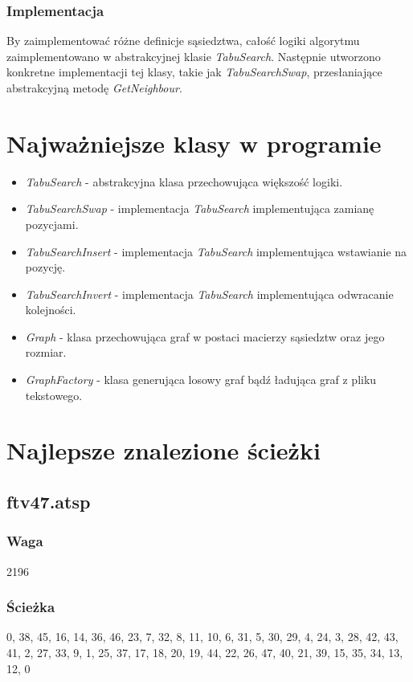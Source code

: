 \documentclass{article}
\begin{document}
\subsubsection{Implementacja}
By zaimplementować różne definicje sąsiedztwa, całość logiki algorytmu zaimplementowano w abstrakcyjnej klasie \textit{TabuSearch}. Następnie utworzono konkretne implementacji tej klasy, takie jak \textit{TabuSearchSwap}, przesłaniające abstrakcyjną metodę \textit{GetNeighbour}.


\section{Najważniejsze klasy w programie}
\begin{itemize}
    \item \textit{TabuSearch} - abstrakcyjna klasa przechowująca większość logiki.
    \item \textit{TabuSearchSwap} - implementacja \textit{TabuSearch} implementująca zamianę pozycjami.
    \item \textit{TabuSearchInsert} - implementacja \textit{TabuSearch} implementująca wstawianie na pozycję.
    \item \textit{TabuSearchInvert} - implementacja \textit{TabuSearch} implementująca odwracanie kolejności.
    \item \textit{Graph} - klasa przechowująca graf w postaci macierzy sąsiedztw oraz jego rozmiar.
    \item \textit{GraphFactory} - klasa generująca losowy graf bądź ładująca graf z pliku tekstowego.
\end{itemize}

\section{Najlepsze znalezione ścieżki}
\subsection{ftv47.atsp}
\subsubsection{Waga}
2196
\subsubsection{Ścieżka}
0, 38, 45, 16, 14, 36, 46, 23, 7, 32, 8, 11, 10, 6, 31, 5, 30, 29, 4, 24, 3, 28, 42, 43, 41, 2, 27, 33, 9, 1, 25, 37, 17, 18, 20, 19, 44, 22, 26, 47, 40, 21, 39, 15, 35, 34, 13, 12, 0
\end{document}
